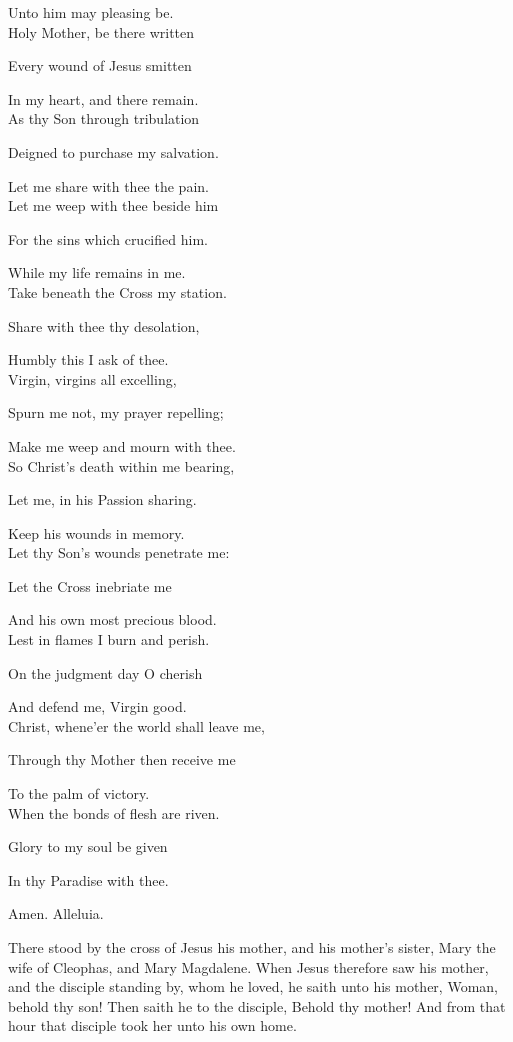 \begin{multicols}{2}
Unto him may pleasing be.\\

Holy Mother, be there written

Every wound of Jesus smitten

In my heart, and there remain.\\

As thy Son through tribulation

Deigned to purchase my salvation.

Let me share with thee the pain.\\

Let me weep with thee beside him

For the sins which crucified him.

While my life remains in me.\\

Take beneath the Cross my station.

Share with thee thy desolation,

Humbly this I ask of thee.\\

Virgin, virgins all excelling,

Spurn me not, my prayer repelling;

Make me weep and mourn with thee.\\

So Christ's death within me bearing,

Let me, in his Passion sharing.

Keep his wounds in memory.\\

Let thy Son's wounds penetrate me:

Let the Cross inebriate me

And his own most precious blood.\\

Lest in flames I burn and perish.

On the judgment day O cherish

And defend me, Virgin good.\\

Christ, whene'er the world shall leave me,

Through thy Mother then receive me

To the palm of victory.\\

When the bonds of flesh are riven.

Glory to my soul be given

In thy Paradise with thee.

Amen. Alleluia.
\end{multicols}
 There stood by the cross of Jesus his mother, and his mother's sister, Mary the wife of Cleophas, and Mary Magdalene. When Jesus therefore saw his mother, and the disciple standing by, whom he loved, he saith unto his mother, Woman, behold thy son! Then saith he to the disciple, Behold thy mother! And from that hour that disciple took her unto his own home.

